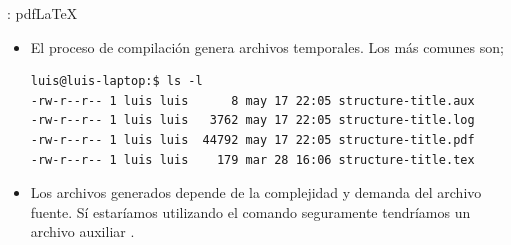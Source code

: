 \documentclass{beamer}
\begin{document}
\begin{frame}[fragile]{\insertsection: pdf\LaTeX{}}
  \begin{itemize}
  \item El proceso de compilación genera archivos temporales. Los más
    comunes son;
    \begin{center}
      \begin{verbatim}
luis@luis-laptop:$ ls -l
-rw-r--r-- 1 luis luis      8 may 17 22:05 structure-title.aux
-rw-r--r-- 1 luis luis   3762 may 17 22:05 structure-title.log
-rw-r--r-- 1 luis luis  44792 may 17 22:05 structure-title.pdf
-rw-r--r-- 1 luis luis    179 mar 28 16:06 structure-title.tex
      \end{verbatim}
    \end{center}
  \item Los archivos generados depende de la complejidad y demanda
    del archivo fuente. Sí estaríamos utilizando el comando
     seguramente tendríamos un archivo
    auxiliar .
  \end{itemize}
\end{frame}
\end{document}
